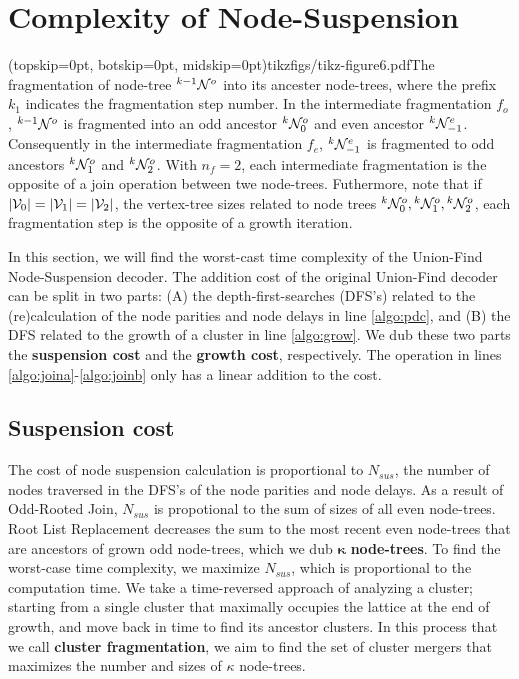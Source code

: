 
\section{Complexity of Node-Suspension}\label{sec:complexity}

\Figure[htb](topskip=0pt, botskip=0pt, midskip=0pt){tikzfigs/tikz-figure6.pdf}{The fragmentation of node-tree ${}^{k-1}\mathcal{N}^o$ into its ancester node-trees, where the prefix $k_1$ indicates the fragmentation step number. In the intermediate fragmentation $f_o$, ${}^{k-1}\mathcal{N}^o$ is fragmented into an odd ancestor ${}^{k}\mathcal{N}^o_0$ and even ancestor ${}^{k}\mathcal{N}^e_{-1}$. Consequently in the intermediate fragmentation $f_e$, ${}^{k}\mathcal{N}^e_{-1}$ is fragmented to odd ancestors ${}^{k}\mathcal{N}^o_{1}$ and ${}^{k}\mathcal{N}^o_{2}$. With $n_f=2$, each intermediate fragmentation is the opposite of a join operation between twe node-trees. Futhermore, note that if $\lvert\mathcal{V}_0\rvert = \lvert\mathcal{V}_1\rvert = \lvert\mathcal{V}_2\rvert$, the vertex-tree sizes related to node trees ${}^{k}\mathcal{N}^o_0, {}^{k}\mathcal{N}^o_1, {}^{k}\mathcal{N}^o_2$, each fragmentation step is the opposite of a growth iteration. \label{fig6}}

In this section, we will find the worst-cast time complexity of the Union-Find Node-Suspension decoder. The addition cost of the original Union-Find decoder can be split in two parts: (A) the depth-first-searches (DFS's) related to the (re)calculation of the node parities and node delays in line \ref{algo:pdc}, and (B) the DFS related to the growth of a cluster in line \ref{algo:grow}. We dub these two parts the \textbf{suspension cost} and the \textbf{growth cost}, respectively. The  operation in lines \ref{algo:joina}-\ref{algo:joinb} only has a linear addition to the cost.

\subsection{Suspension cost}\label{sec:suscomplexity}

The cost of node suspension calculation is proportional to $N_{sus}$, the number of nodes traversed in the DFS's of the node parities and node delays. As a result of Odd-Rooted Join, $N_{sus}$ is propotional to the sum of sizes of all even node-trees. Root List Replacement decreases the sum to the most recent even node-trees that are ancestors of grown odd node-trees, which we dub $\mathbf{\kappa}$ \textbf{node-trees}. To find the worst-case time complexity, we maximize $N_{sus}$, which is proportional to the computation time. We take a time-reversed approach of analyzing a cluster; starting from a single cluster that maximally occupies the lattice at the end of growth, and move back in time to find its ancestor clusters. In this process that we call \textbf{cluster fragmentation}, we aim to find the set of cluster mergers that maximizes the number and sizes of $\kappa$ node-trees. 

